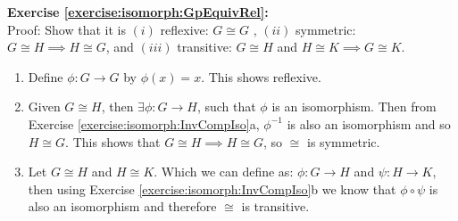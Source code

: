 \noindent\textbf{Exercise \ref{exercise:isomorph:GpEquivRel}:}
\\
Proof: Show that it is $(i)$ reflexive: $G \cong G$ , $(ii)$ symmetric: $G \cong H \implies H \cong G$, and $(iii)$ transitive: $G \cong H$ and $H \cong K \implies G \cong K$. 
\begin{enumerate}[($i$)]
\item
Define $\phi: G \rightarrow G$ by $\phi(x) = x$.  This shows reflexive.

\item
Given $G \cong H$, then $\exists \phi: G\rightarrow H$, such that $\phi$ is an isomorphism. Then from Exercise \ref{exercise:isomorph:InvCompIso}a, $\phi^{-1}$ is also an isomorphism and so $H \cong G$. This shows that $G \cong H \implies H \cong G$, so $\cong$ is symmetric.

\item
Let $G \cong H$ and $H \cong K$. Which we can define as: $\phi: G \rightarrow H$ and $\psi: H \rightarrow K$, then using Exercise \ref{exercise:isomorph:InvCompIso}b we know that $\phi \circ \psi$ is also an isomorphism and therefore $\cong$ is transitive.
\end{enumerate}

